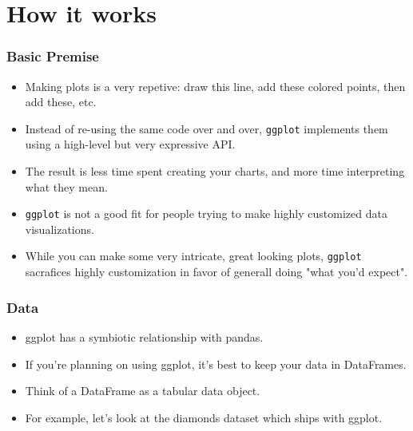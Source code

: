 \documentclass{beamer}
\begin{document}
\section{How it works}
\begin{frame}[fragile]
	\Large
	\frametitle{Basic Premise}
	\begin{itemize}
		\item Making plots is a very repetive: draw this line, add these colored points, then add these, etc. 
		\item Instead of re-using the same code over and over, \texttt{ggplot} implements them using a high-level but very expressive API.
		\item The result is less time spent creating your charts, and more time interpreting what they mean.
	\end{itemize}
	
\end{frame}
\begin{frame}[fragile]
	\Large
	\begin{itemize}
		\item \texttt{ggplot} is not a good fit for people trying to make highly customized data visualizations. 
		\item While you can make some very intricate, great looking plots, \texttt{ggplot} sacrafices highly customization in favor of generall doing "what you'd expect".
	\end{itemize}
	
\end{frame}
\begin{frame}[fragile]
	\frametitle{Data}
	\Large
	\begin{itemize}
		\item ggplot has a symbiotic relationship with pandas. 
		\item If you're planning on using ggplot, it's best to keep your data in DataFrames. 
		\item Think of a DataFrame as a tabular data object. 
		\item For example, let's look at the diamonds dataset which ships with ggplot.
	\end{itemize}
\end{frame}
\end{document}
